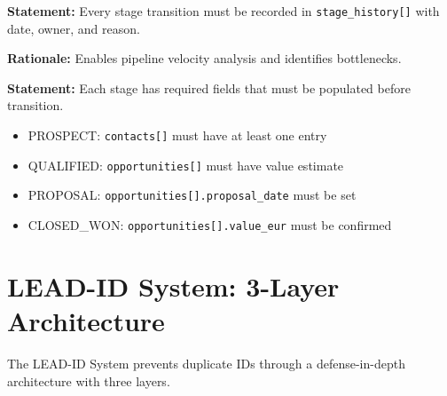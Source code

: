 \begin{tcolorbox}[colback=gray!5!white, colframe=gray!75!black,
    title=Rule LM-2: Stage History]
\textbf{Statement:} Every stage transition must be recorded in \texttt{stage\_history[]} with date, owner, and reason.

\textbf{Rationale:} Enables pipeline velocity analysis and identifies bottlenecks.
\end{tcolorbox}

\begin{tcolorbox}[colback=gray!5!white, colframe=gray!75!black,
    title=Rule LM-3: Mandatory Fields per Stage]
\textbf{Statement:} Each stage has required fields that must be populated before transition.

\begin{itemize}[nosep]
\item PROSPECT: \texttt{contacts[]} must have at least one entry
\item QUALIFIED: \texttt{opportunities[]} must have value estimate
\item PROPOSAL: \texttt{opportunities[].proposal\_date} must be set
\item CLOSED\_WON: \texttt{opportunities[].value\_eur} must be confirmed
\end{itemize}
\end{tcolorbox}


\section{LEAD-ID System: 3-Layer Architecture}
\label{sec:bn-id-system}

The LEAD-ID System prevents duplicate IDs through a defense-in-depth architecture with three layers.

